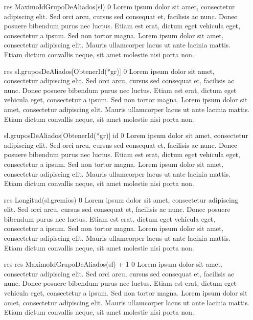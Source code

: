 {
	\state res \asig MaximoIdGrupoDeAliados(sl)			
}
{0}
{Lorem ipsum dolor sit amet, consectetur adipiscing elit. Sed orci arcu, cursus sed consequat et, facilisis ac nunc. Donec posuere bibendum purus nec luctus. Etiam est erat, dictum eget vehicula eget, consectetur a ipsum. Sed non tortor magna. Lorem ipsum dolor sit amet, consectetur adipiscing elit. Mauris ullamcorper lacus ut ante lacinia mattis. Etiam dictum convallis neque, sit amet molestie nisi porta non.}

{
	\state res \asig sl.gruposDeAliados[ObtenerId(*gr)]			
}
{0}
{Lorem ipsum dolor sit amet, consectetur adipiscing elit. Sed orci arcu, cursus sed consequat et, facilisis ac nunc. Donec posuere bibendum purus nec luctus. Etiam est erat, dictum eget vehicula eget, consectetur a ipsum. Sed non tortor magna. Lorem ipsum dolor sit amet, consectetur adipiscing elit. Mauris ullamcorper lacus ut ante lacinia mattis. Etiam dictum convallis neque, sit amet molestie nisi porta non.}

{
	\state sl.gruposDeAliados[ObtenerId(*gr)] \asig id			
}
{0}
{Lorem ipsum dolor sit amet, consectetur adipiscing elit. Sed orci arcu, cursus sed consequat et, facilisis ac nunc. Donec posuere bibendum purus nec luctus. Etiam est erat, dictum eget vehicula eget, consectetur a ipsum. Sed non tortor magna. Lorem ipsum dolor sit amet, consectetur adipiscing elit. Mauris ullamcorper lacus ut ante lacinia mattis. Etiam dictum convallis neque, sit amet molestie nisi porta non.}

{
	\state res \asig Longitud(sl.gremios)			
}
{0}
{Lorem ipsum dolor sit amet, consectetur adipiscing elit. Sed orci arcu, cursus sed consequat et, facilisis ac nunc. Donec posuere bibendum purus nec luctus. Etiam est erat, dictum eget vehicula eget, consectetur a ipsum. Sed non tortor magna. Lorem ipsum dolor sit amet, consectetur adipiscing elit. Mauris ullamcorper lacus ut ante lacinia mattis. Etiam dictum convallis neque, sit amet molestie nisi porta non.}

{
						
		\state res 										
	\Else
		\state res \asig MaximoIdGrupoDeAliados(sl) + 1			
	\endif
}
{0}
{Lorem ipsum dolor sit amet, consectetur adipiscing elit. Sed orci arcu, cursus sed consequat et, facilisis ac nunc. Donec posuere bibendum purus nec luctus. Etiam est erat, dictum eget vehicula eget, consectetur a ipsum. Sed non tortor magna. Lorem ipsum dolor sit amet, consectetur adipiscing elit. Mauris ullamcorper lacus ut ante lacinia mattis. Etiam dictum convallis neque, sit amet molestie nisi porta non.}

